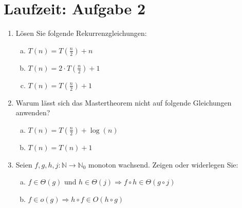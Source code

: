 \documentclass{scrartcl}
\begin{document}
\section*{Laufzeit: Aufgabe 2}
\begin{enumerate}[(1)]


\item L\"osen Sie folgende Rekurrenzgleichungen:
\begin{enumerate}[(a)]
\item $T(n)=T(\frac{n}{2})+n$
\item $T(n)=2\cdot T(\frac{n}{2})+1$
\item $T(n)=T(\frac{n}{2})+1$
\end{enumerate}

\item Warum l\"asst sich das Mastertheorem nicht auf folgende Gleichungen anwenden?
\begin{enumerate}[(a)]
\item $T(n)=T(\frac{n}{2})+\log(n)$
\item $T(n)=T(n)+1$
\end{enumerate}

\item Seien $f,g,h,j: \mathbb{N}\to\mathbb{N}_0$ monoton wachsend. Zeigen oder widerlegen Sie:
\begin{enumerate}[(a)]
\item $f\in\Theta(g)$ und $h\in\Theta(j)\Rightarrow f\circ h \in \Theta(g\circ j)$
\item $f\in o(g)\Rightarrow h\circ f \in O(h\circ g)$
\end{enumerate}

\end{enumerate}
\end{document}
